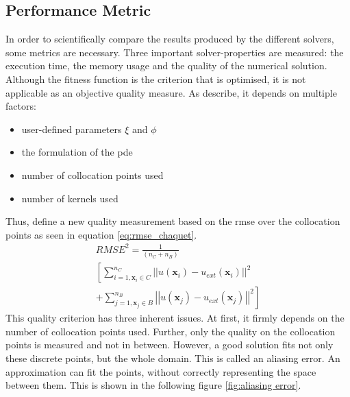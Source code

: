 \documentclass[./\jobname.tex]{subfiles}
\begin{document}
\subsection{Performance Metric} 
\label{chap:metric}
In order to scientifically compare the results produced by the different solvers, some metrics are necessary. Three important solver-properties are measured: the execution time, the memory usage and the quality of the numerical solution. Although the fitness function is the criterion that is optimised, it is not applicable as an objective quality measure. As \cite{chaquet_using_2019} describe, it depends on multiple factors:
\begin{itemize}
	\item user-defined parameters $\xi$ and $\phi$ 
	\item the formulation of the \gls{pde} 
	\item number of collocation points used 
	\item number of kernels used
\end{itemize}
Thus, \cite{chaquet_using_2019} define a new quality measurement based on the \gls{rmse} over the collocation points as seen in equation \eqref{eq:rmse_chaquet}. 
\begin{equation}
\label{eq:rmse_chaquet}
\begin{split}
RMSE^2 = \frac{1}{(n_C + n_B)} \\ \left[\sum_{i=1, \mathbf{x}_i \in C}^{n_C} \right. \left|\left| u(\mathbf{x}_i) - u_{ext}(\mathbf{x}_i) \right|\right|^2 \\ + \left. \sum_{j=1, \mathbf{x}_j \in B}^{n_B} \left|\left| u(\mathbf{x}_j) - u_{ext}(\mathbf{x}_j) \right|\right|^2 \right]
\end{split}
\end{equation}
This quality criterion has three inherent issues. At first, it firmly depends on the number of collocation points used. Further, only the quality on the collocation points is measured and not in between. However, a good solution fits not only these discrete points, but the whole domain. This is called an aliasing error. An approximation can fit the points, without correctly representing the space between them. This is shown in the following figure \ref{fig:aliasing error}.
\end{document}
